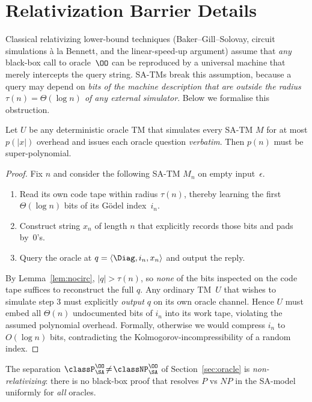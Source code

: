 \section{Relativization Barrier Details}

Classical relativizing lower-bound techniques
(Baker–Gill–Solovay, circuit simulations à la Bennett, 
and the linear-speed-up argument) assume that
\emph{any} black-box call to oracle~$\OO$ can be reproduced by
a universal machine that merely intercepts the query string.
SA-TMs break this assumption, because a query may depend on
\emph{bits of the machine description that are
outside the radius $\tau(n)=\Theta(\log n)$ of any external simulator}. 
Below we formalise this obstruction.

\begin{theorem}\label{thm:nonrel}
Let $U$ be any deterministic oracle TM that simulates
every SA-TM $M$ for at most $p(|x|)$ overhead
and issues each oracle question \emph{verbatim}.
Then $p(n)$ must be super-polynomial.
\end{theorem}

\begin{proof}
Fix $n$ and consider the following SA-TM $M_n$ on empty input~$\epsilon$.
\begin{enumerate}
  \item Read its own code tape within radius $\tau(n)$,
        thereby learning the first $\Theta(\log n)$ bits of its Gödel index~$i_n$.
  \item Construct string $x_n$ of length $n$ 
        that explicitly records those bits and pads by~$0$’s.
  \item Query the oracle at $q=\langle\Diag,i_n,x_n\rangle$ and output the reply.
\end{enumerate}
By Lemma~\ref{lem:nocirc}, $|q|>\tau(n)$,
so \emph{none} of the bits inspected on the code tape suffices
to reconstruct the full $q$.
Any ordinary TM~$U$ that wishes to simulate step 3
must explicitly \emph{output} $q$ on its own oracle channel.
Hence $U$ must embed all $\Theta(n)$ undocumented bits of $i_n$
into its work tape, violating the assumed polynomial overhead.
Formally, otherwise we would compress $i_n$ to $O(\log n)$ bits,
contradicting the Kolmogorov-incompressibility of a random index.
\end{proof}

\begin{corollary}
The separation $\classP_{\SA}^\OO\!\neq\!\classNP_{\SA}^\OO$
of Section~\ref{sec:oracle} is \emph{non-relativizing}:
there is no black-box proof that resolves $P$ vs $NP$
in the SA-model uniformly for \emph{all} oracles.
\end{corollary}
